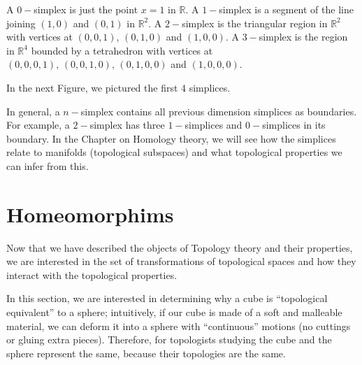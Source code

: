 \documentclass[
	fontsize=10pt, %
	twoside=false, %
	secnumdepth=1, %
]{kaobook}
\begin{document}
\begin{example}
A $0-$simplex is just the point $x=1$ in $\mathbb{R}.$ A $1-$simplex is a segment of the line joining $(1,0)$ and $(0,1)$ in $\mathbb{R}^2.$ A $2-$simplex is the triangular region in $\mathbb{R}^2$ with vertices at $(0,0,1),\,(0,1,0)$ and $(1,0,0).$ A $3-$simplex is the region in $\mathbb{R}^4$ bounded by a tetrahedron with vertices at $(0,0,0,1),\,(0,0,1,0),\,(0,1,0,0)$ and $(1,0,0,0).$

In the next Figure, we pictured the first 4 simplices.
\end{example}

In general, a $n-$simplex contains all previous dimension simplices as boundaries. For example, a $2-$simplex has three $1-$simplices and $0-$simplices in its boundary. In the Chapter on Homology theory, we will see how the simplices relate to manifolds (topological subspaces) and what topological properties we can infer from this.



%
%
%
%

\section{Homeomorphims}

Now that we have described the objects of Topology theory and their properties, we are interested in the set of transformations of topological spaces and how they interact with the topological properties.

In this section, we are interested in determining why a cube is ``topological equivalent'' to a sphere; intuitively, if our cube is made of a soft and malleable material, we can deform it into a sphere with ``continuous'' motions (no cuttings or gluing extra pieces). Therefore, for topologists studying the cube and the sphere represent the same, because their topologies are the same. 
\end{document}
